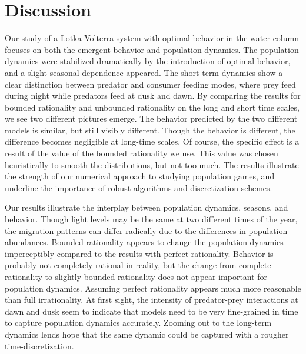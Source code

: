 \section{Discussion}
Our study of a Lotka-Volterra system with optimal behavior in the water column focuses on both the emergent behavior and population dynamics. The population dynamics were stabilized dramatically by the introduction of optimal behavior, and a slight seasonal dependence appeared. The short-term dynamics show a clear distinction between predator and consumer feeding modes, where prey feed during night while predators feed at dusk and dawn. By comparing the results for bounded rationality and unbounded rationality on the long and short time scales, we see two different pictures emerge. The behavior predicted by the two different models is similar, but still visibly different. Though the behavior is different, the difference becomes negligible at long-time scales. Of course, the specific effect is a result of the value of the bounded rationality we use. This value was chosen heuristically to smooth the distributions, but not too much. The results illustrate the strength of our numerical approach to studying population games, and underline the importance of robust algorithms and discretization schemes.


Our results illustrate the interplay between population dynamics, seasons, and behavior. Though light levels may be the same at two different times of the year, the migration patterns can differ radically due to the differences in population abundances. Bounded rationality appears to change the population dynamics imperceptibly compared to the results with perfect rationality. Behavior is probably not completely rational in reality, but the change from complete rationality to slightly  bounded rationality does not appear important for population dynamics. Assuming perfect rationality appears much more reasonable than full irrationality. At first sight, the intensity of predator-prey interactions at dawn and dusk seem to indicate that models need to be very fine-grained in time to capture population dynamics accurately. Zooming out to the long-term dynamics lends hope that the same dynamic could be captured with a rougher time-discretization.


